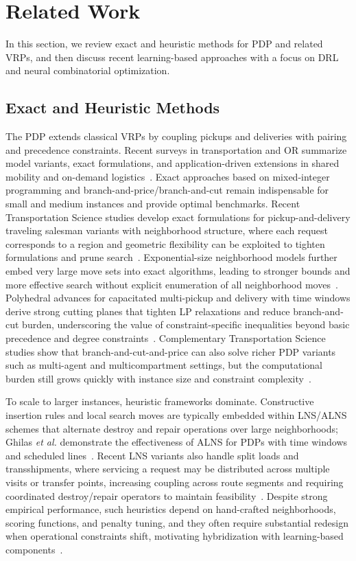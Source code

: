 \documentclass[pdflatex,sn-basic,Numbered]{sn-jnl}
\begin{document}
\section{Related Work}\label{sec:related}

In this section, we review exact and heuristic methods for PDP and related VRPs, and then discuss recent learning-based approaches with a focus on DRL and neural combinatorial optimization.

\subsection{Exact and Heuristic Methods}

The PDP extends classical VRPs by coupling pickups and deliveries with pairing and precedence constraints. Recent surveys in transportation and OR summarize model variants, exact formulations, and application-driven extensions in shared mobility and on-demand logistics~\cite{Parragh2008,mourad2019survey}. Exact approaches based on mixed-integer programming and branch-and-price/branch-and-cut remain indispensable for small and medium instances and provide optimal benchmarks. Recent Transportation Science studies develop exact formulations for pickup-and-delivery traveling salesman variants with neighborhood structure, where each request corresponds to a region and geometric flexibility can be exploited to tighten formulations and prune search~\cite{gao2023exact}. Exponential-size neighborhood models further embed very large move sets into exact algorithms, leading to stronger bounds and more effective search without explicit enumeration of all neighborhood moves~\cite{pacheco2023expneigh}. Polyhedral advances for capacitated multi-pickup and delivery with time windows derive strong cutting planes that tighten LP relaxations and reduce branch-and-cut burden, underscoring the value of constraint-specific inequalities beyond basic precedence and degree constraints~\cite{kohar2023cutting}. Complementary Transportation Science studies show that branch-and-cut-and-price can also solve richer PDP variants such as multi-agent and multicompartment settings, but the computational burden still grows quickly with instance size and constraint complexity~\cite{lam2024bcp,aerts2024bpc}.

To scale to larger instances, heuristic frameworks dominate. Constructive insertion rules and local search moves are typically embedded within LNS/ALNS schemes that alternate destroy and repair operations over large neighborhoods; Ghilas \emph{et al.} demonstrate the effectiveness of ALNS for PDPs with time windows and scheduled lines~\cite{ghilas2016alns}. Recent LNS variants also handle split loads and transshipments, where servicing a request may be distributed across multiple visits or transfer points, increasing coupling across route segments and requiring coordinated destroy/repair operators to maintain feasibility~\cite{li2016adaptive}. Despite strong empirical performance, such heuristics depend on hand-crafted neighborhoods, scoring functions, and penalty tuning, and they often require substantial redesign when operational constraints shift, motivating hybridization with learning-based components~\cite{zhao2021hybrid}.
\end{document}
